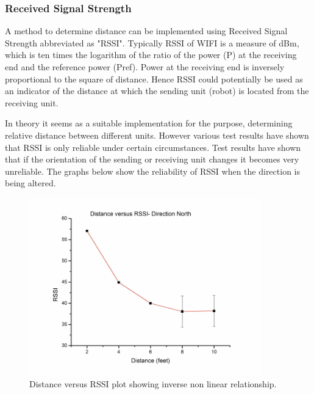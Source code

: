 \documentclass[10pt,a4paper]{article}
\begin{document}
\subsubsection{Received Signal Strength}
A method to determine distance can be implemented using Received Signal Strength abbreviated as "RSSI". Typically RSSI of WIFI is a measure of dBm, which is ten times the logarithm of the ratio of the power (P) at the receiving end and the reference power (Pref). Power at the receiving end is inversely proportional to the square of distance.\cite{RSSI} Hence RSSI could potentially be used as an indicator of the distance at which the sending unit (robot) is located from the receiving unit.\cite{RSSI}

In theory it seems as a suitable implementation for the purpose, determining relative distance between different units. However various test results have shown that RSSI is only reliable under certain circumstances. Test results have shown that if the orientation of the sending or receiving unit changes it becomes very unreliable. The graphs below show the reliability of RSSI when the direction is being altered.\cite{RSSI}

\begin{figure}[H]
\centering
\includegraphics[width=0.9\textwidth]{North.pdf}
\caption{Distance versus RSSI plot showing inverse non linear
relationship.\cite{RSSI}}
\label{North}
\end{figure}
\end{document}
